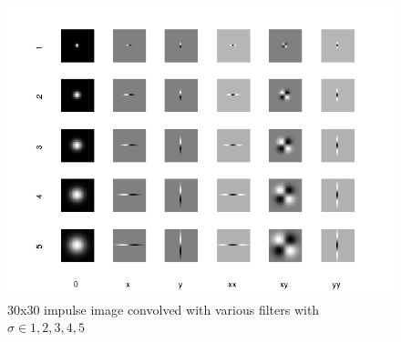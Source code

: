 \documentclass[a4paper,10pt]{article}
\begin{document}
\begin{figure}[ht]
\centering
\includegraphics[width=\textwidth]{zebra_img/impulse}
\caption{30x30 impulse image convolved with various filters with $\sigma \in {1,2,3,4,5}$}
\label{fig:impulse}
\end{figure}
\end{document}

